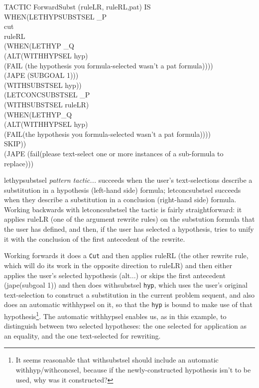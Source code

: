 TACTIC ForwardSubst (ruleLR, ruleRL,pat) IS\\
\tab WHEN\tab (LETHYPSUBSTSEL \_P \\
\tab \tab \tab cut\\
\tab \tab \tab ruleRL \\
\tab \tab \tab (WHEN\tab (LETHYP \_Q \\
\tab \tab \tab \tab \tab (ALT\tab (WITHHYPSEL hyp) \\
\tab \tab \tab \tab \tab \tab (FAIL (the hypothesis you formula-selected wasn't a pat formula))))\\
\tab \tab \tab \tab (JAPE (SUBGOAL 1))) \\
\tab \tab \tab (WITHSUBSTSEL hyp))\\
\tab \tab (LETCONCSUBSTSEL \_P\\
\tab \tab \tab (WITHSUBSTSEL ruleLR)\\
\tab \tab \tab (WHEN\tab (LETHYP\_Q \\
\tab \tab \tab \tab \tab (ALT\tab (WITHHYPSEL hyp) \\
\tab \tab \tab \tab \tab \tab (FAIL(the hypothesis you formula-selected wasn't a pat formula))))\\
\tab \tab \tab \tab SKIP))\\
\tab \tab (JAPE (fail(please text-select one or more instances of a sub-formula to replace)))


lethypsubstsel \textit{pattern tactic...} succeeds when the user's text-selections describe a substitution in a hypothesis (left-hand side) formula; letconcsubstsel succeeds when they describe a substitution in a conclusion (right-hand side) formula.\\
Working backwards with letconcsubstsel the tactic is fairly straightforward: it applies ruleLR (one of the argument rewrite rules) on the substution formula that the user has defined, and then, if the user has selected a hypothesis, tries to unify it with the conclusion of the first antecedent of the rewrite.


Working forwards it does a \texttt{Cut} and then applies ruleRL (the other rewrite rule, which will do its work in the opposite direction to ruleLR) and then either applies the user's selected hypothesis (alt...) or skips the first antecedent (jape(subgoal 1)) and then does withsubstsel \texttt{hyp}, which uses the user's original text-selection to construct a substitution in the current problem sequent, and also does an automatic withhypsel on it, so that the \texttt{hyp} is bound to make use of that hypothesis\footnote{It seems reasonable that withsubstsel should include an automatic withhyp/withconcsel, because if the newly-constructed hypothesis isn't to be used, why was it constructed?}. The automatic withhypsel enables us, as in this example, to distinguish between two selected hypotheses: the one selected for application as an equality, and the one text-selected for rewriting.


